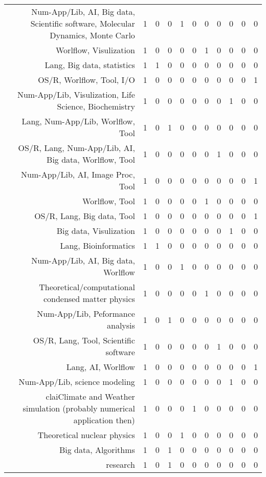 {\begin{landscape}
\begin{longtable}[htb]{r|c|c|c|c|c|c|c|c|c|c}
{Num-App/Lib, AI, Big data, Scientific software, Molecular Dynamics, Monte Carlo} & 1 & 0 & 0 & 1 & 0 & 0 & 0 & 0 & 0 & 0 \\%
{Worlflow, Visulization} & 1 & 0 & 0 & 0 & 0 & 1 & 0 & 0 & 0 & 0 \\%
{Lang, Big data, statistics} & 1 & 1 & 0 & 0 & 0 & 0 & 0 & 0 & 0 & 0 \\%
{OS/R, Worlflow, Tool, I/O} & 1 & 0 & 0 & 0 & 0 & 0 & 0 & 0 & 0 & 1 \\%
{Num-App/Lib, Visulization, Life Science, Biochemistry} & 1 & 0 & 0 & 0 & 0 & 0 & 0 & 1 & 0 & 0 \\%
{Lang, Num-App/Lib, Worlflow, Tool} & 1 & 0 & 1 & 0 & 0 & 0 & 0 & 0 & 0 & 0 \\%
{OS/R, Lang, Num-App/Lib, AI, Big data, Worlflow, Tool} & 1 & 0 & 0 & 0 & 0 & 0 & 1 & 0 & 0 & 0 \\%
{Num-App/Lib, AI, Image Proc, Tool} & 1 & 0 & 0 & 0 & 0 & 0 & 0 & 0 & 0 & 1 \\%
{Worlflow, Tool} & 1 & 0 & 0 & 0 & 0 & 1 & 0 & 0 & 0 & 0 \\%
{OS/R, Lang, Big data, Tool} & 1 & 0 & 0 & 0 & 0 & 0 & 0 & 0 & 0 & 1 \\%
{Big data, Visulization} & 1 & 0 & 0 & 0 & 0 & 0 & 0 & 1 & 0 & 0 \\%
{Lang, Bioinformatics} & 1 & 1 & 0 & 0 & 0 & 0 & 0 & 0 & 0 & 0 \\%
{Num-App/Lib, AI, Big data, Worlflow} & 1 & 0 & 0 & 1 & 0 & 0 & 0 & 0 & 0 & 0 \\%
{Theoretical/computational condensed matter physics} & 1 & 0 & 0 & 0 & 0 & 1 & 0 & 0 & 0 & 0 \\%
{Num-App/Lib, Peformance analysis} & 1 & 0 & 1 & 0 & 0 & 0 & 0 & 0 & 0 & 0 \\%
{OS/R, Lang, Tool, Scientific software} & 1 & 0 & 0 & 0 & 0 & 0 & 1 & 0 & 0 & 0 \\%
{Lang, AI, Worlflow} & 1 & 0 & 0 & 0 & 0 & 0 & 0 & 0 & 0 & 1 \\%
{Num-App/Lib, science modeling} & 1 & 0 & 0 & 0 & 0 & 0 & 0 & 1 & 0 & 0 \\%
{claiClimate and Weather simulation (probably numerical application then)} & 1 & 0 & 0 & 0 & 1 & 0 & 0 & 0 & 0 & 0 \\%
{Theoretical nuclear physics} & 1 & 0 & 0 & 1 & 0 & 0 & 0 & 0 & 0 & 0 \\%
{Big data, Algorithms} & 1 & 0 & 1 & 0 & 0 & 0 & 0 & 0 & 0 & 0 \\%
{research} & 1 & 0 & 1 & 0 & 0 & 0 & 0 & 0 & 0 & 0 \\%

\end{longtable}
\end{landscape}}
